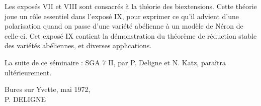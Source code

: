 Les exposés VII et VIII sont consacrés à la théorie des biextensions.
Cette théorie joue un rôle essentiel dans l'exposé IX, pour exprimer
ce qu'il advient d'une polarisation quand on passe d'une variété abélienne
à un modèle de Néron de celle-ci. Cet exposé IX contient la démonstration
du théorème de réduction stable des variétés abéliennes, et diverses applications.

La suite de ce séminaire : SGA 7 II, par P. Deligne et N. Katz, paraîtra
ultérieurement.

\begin{flushright}
Bures sur Yvette, mai 1972,\\[1ex]
P. DELIGNE
\end{flushright}
